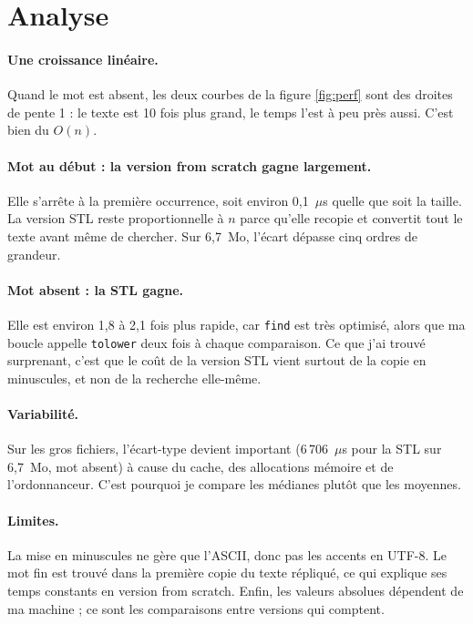 \documentclass[11pt,a4paper]{article}
\begin{document}
\section{Analyse}

\paragraph{Une croissance linéaire.}
Quand le mot est absent, les deux courbes de la figure \ref{fig:perf} sont des droites de
pente 1 : le texte est 10 fois plus grand, le temps l'est à peu près aussi. C'est bien du $O(n)$.

\paragraph{Mot au début : la version from scratch gagne largement.}
Elle s'arrête à la première occurrence, soit environ 0,1~$\mu$s quelle que soit la taille.
La version STL reste proportionnelle à $n$ parce qu'elle recopie et convertit tout le texte
avant même de chercher. Sur 6,7~Mo, l'écart dépasse cinq ordres de grandeur.

\paragraph{Mot absent : la STL gagne.}
Elle est environ 1,8 à 2,1 fois plus rapide, car \texttt{find} est très optimisé, alors
que ma boucle appelle \texttt{tolower} deux fois à chaque comparaison.
Ce que j'ai trouvé surprenant, c'est que le coût de la version STL vient surtout de la
copie en minuscules, et non de la recherche elle-même.

\paragraph{Variabilité.}
Sur les gros fichiers, l'écart-type devient important (6\,706~$\mu$s pour la STL sur 6,7~Mo,
mot absent) à cause du cache, des allocations mémoire et de l'ordonnanceur. C'est pourquoi
je compare les médianes plutôt que les moyennes.

\paragraph{Limites.}
La mise en minuscules ne gère que l'ASCII, donc pas les accents en UTF-8. Le mot \og fin \fg{}
est trouvé dans la première copie du texte répliqué, ce qui explique ses temps constants
en version from scratch. Enfin, les valeurs absolues dépendent de ma machine ; ce sont les
comparaisons entre versions qui comptent.
\end{document}
